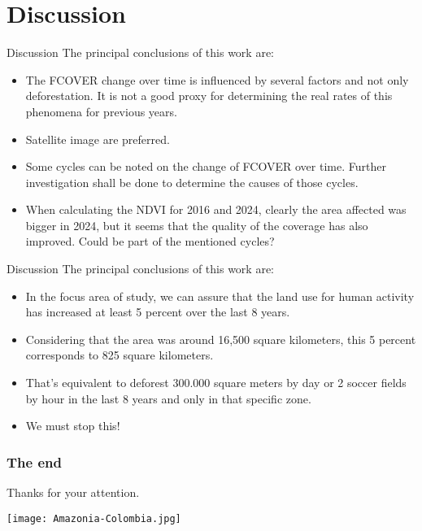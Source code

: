 \documentclass{beamer}
\begin{document}
\section{Discussion}
\begin{frame}{Discussion}
The principal conclusions of this work are:

\bigskip

\begin{itemize}
  \item The FCOVER change over time is influenced by several factors and not only deforestation. It is not a good proxy for determining the real rates of this phenomena for previous years.
  \item Satellite image are preferred.
  \item Some cycles can be noted on the change of FCOVER over time. Further investigation shall be done to determine the causes of those cycles.
  \item When calculating the NDVI for 2016 and 2024, clearly the area affected was bigger in 2024, but it seems that the quality of the coverage has also improved. Could be part of the mentioned cycles?
 \end{itemize}
\end{frame}

\begin{frame}{Discussion}
The principal conclusions of this work are:

\bigskip

\begin{itemize}
  \item In the focus area of study, we can assure that the land use for human activity has increased at least 5 percent over the last 8 years.
  \item Considering that the area was around 16,500 square kilometers, this 5 percent corresponds to 825 square kilometers.
  \item That's equivalent to deforest 300.000 square meters by day or 2 soccer fields by hour in the last 8 years and only in that specific zone.
  \item We must stop this!
 \end{itemize}
\end{frame}

\begin{frame}
\frametitle{The end}
Thanks for your attention. 

\bigskip

\centering
\texttt{[image: Amazonia-Colombia.jpg]}
\end{frame}
\end{document}
